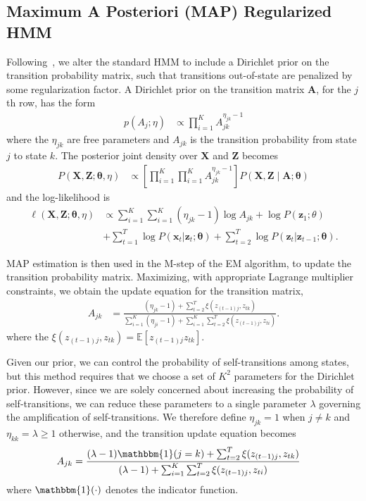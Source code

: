 \documentclass[letterpaper]{article}
\begin{document}
\subsection{Maximum A Posteriori (MAP) Regularized HMM}

Following~\cite{MAP1994}, we alter the standard HMM to include a Dirichlet prior on the transition probability matrix, such that transitions out-of-state are penalized by some regularization factor. A Dirichlet prior on the transition matrix $\mathbf{A}$, for the $j$th row, has the form
\begin{align*}
    p(A_j; \eta) &\propto \prod_{i=1}^{K} A_{jk}^{\eta_{jk}-1}
\end{align*}
where the $\eta_{jk}$ are free parameters and $A_{jk}$ is the transition probability from state $j$ to state $k$. The posterior joint density over $\mathbf{X}$ and $\mathbf{Z}$ becomes
\begin{align*}
    P(\mathbf{X}, \mathbf{Z} ; \mathbf{\theta}, \eta) 
    &\propto \left[\prod_{i=1}^{K}\prod_{i=1}^{K} A_{jk}^{\eta_{jk} - 1}\right] P(\mathbf{X}, \mathbf{Z} \mid \mathbf{A}; \mathbf{\theta}) 
\end{align*}
and the log-likelihood is
\begin{align*}
\ell(\mathbf{X}, \mathbf{Z} ; \mathbf{\theta}, \eta) 
&\propto \sum_{i=1}^{K}\sum_{i=1}^{K} (\eta_{jk} - 1)\log A_{jk} + \log P(\mathbf{z}_{1}; \theta) \\
&+ \sum_{t=1}^{T}\log P(\mathbf{x}_t|\mathbf{z}_t; \mathbf{\theta}) + \sum_{t=2}^{T}\log P(\mathbf{z}_t|\mathbf{z}_{t-1}; \mathbf{\theta}).
\end{align*}

MAP estimation is then used in the M-step of the EM algorithm, to update the transition probability matrix. Maximizing, with appropriate Lagrange multiplier constraints, we obtain the update equation for the transition matrix, 
\begin{align}
    A_{jk} &= \frac{(\eta_{jk} - 1) + \sum_{t=2}^{T} \xi(z_{(t-1)j}, z_{tk})}   
    {\sum_{i=1}^{K}(\eta_{ji} - 1) + \sum_{i=1}^{K}\sum_{t=2}^{T} \xi(z_{(t-1)j}, z_{ti})}.
\end{align}
where the $\xi(z_{(t-1)j}, z_{tk})=\mathbb{E}[z_{(t-1)j}z_{tk}]$.

Given our prior, we can control the probability of self-transitions among states, but this method requires that we choose a set of $K^2$ parameters for the Dirichlet prior. However, since we are solely concerned about increasing the probability of self-transitions, we can reduce these parameters to a single parameter $\lambda$ governing the amplification of self-transitions. We therefore define $\eta_{jk} = 1$ when $j\not=k$ and $\eta_{kk}= \lambda \geq 1$ otherwise, and the transition update equation becomes
\begin{align}\label{eq:MAP-final}
    A_{jk} &= \frac{(\lambda - 1){\mathbbm{1}(j = k)} + \sum_{t=2}^{T} \xi(z_{(t-1)j}, z_{tk})}   
    {(\lambda - 1) + \sum_{i=1}^{K}\sum_{t=2}^{T} \xi(z_{(t-1)j}, z_{ti})}
\end{align}
where $\mathbbm{1}(\cdot)$ denotes the indicator function.
\end{document}
